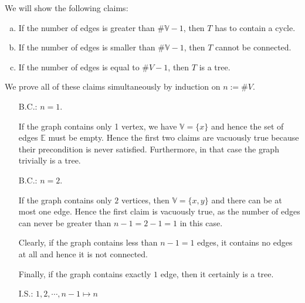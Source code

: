 \proof
We will show the following claims:
\begin{enumerate}[(a)]
\item If the number of edges is greater than $\#\mathbb{V}-1$, then $T$ has to contain a cycle.
\item If the number of edges is smaller than  $\#\mathbb{V}-1$, then $T$ cannot be connected.
\item If the number of edges is equal to $\#V - 1$, then $T$ is a tree.
\end{enumerate}
We prove all of these claims simultaneously by induction on $n := \#V$.
\begin{enumerate}
\item[B.C.:] $n = 1$.

  If the graph contains only 1 vertex, we have $\mathbb{V} = \{x\}$ and hence the set of edges $\mathbb{E}$
  must be empty.  Hence the first two claims are vacuously true because their precondition is never satisfied.
  Furthermore, in that case the graph trivially is a tree.
\item[B.C.:] $n = 2$.

  If the graph contains only $2$ vertices, then $\mathbb{V} = \{ x, y \}$ and there can be at most one edge.
  Hence the first claim is vacuously true, as the number of edges can never be greater than $n-1 = 2 -1 = 1$ in
  this case. 
  
  Clearly, if the graph contains less than $n-1 = 1$ edges, it contains no edges at all and hence it is not
  connected.

  Finally, if the graph contains exactly $1$ edge, then it certainly is a tree.
\item[I.S.:] $1, 2, \cdots, n-1 \mapsto n$


\end{enumerate}
